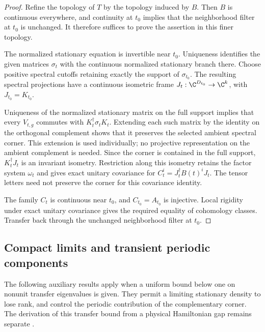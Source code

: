 \begin{proof}\leanok
    Refine the topology of $T$ by the topology induced by $B$.
    Then $B$ is continuous everywhere, and continuity at $t_0$ implies
    that the neighborhood filter at $t_0$ is unchanged. It therefore
    suffices to prove the assertion in this finer topology.

    The normalized stationary equation is invertible near $t_0$.
    Uniqueness identifies the given matrices $\sigma_t$ with the
    continuous normalized stationary branch there. Choose positive
    spectral cutoffs retaining exactly the support of $\sigma_{t_0}$.
    The resulting spectral projections have a continuous isometric
    frame $J_t:\C^{D_{t_0}}\to\C^k$, with $J_{t_0}=K_{t_0}$.

    Uniqueness of the normalized stationary matrix on the full support
    implies that every $V_{t,g}$ commutes with
    $K_t^\dagger\sigma_tK_t$. Extending each such matrix by the identity
    on the orthogonal complement shows that it preserves the selected
    ambient spectral corner. This extension is used individually;
    no projective representation on the ambient complement is needed.
    Since the corner is contained in the full support, $K_t^\dagger J_t$
    is an invariant isometry. Restriction along this isometry retains
    the factor system $\omega_t$ and gives exact unitary covariance for
    $C_t^i=J_t^\dagger B(t)^iJ_t$. The tensor letters need not preserve
    the corner for this covariance identity.

    The family $C_t$ is continuous near $t_0$, and
    $C_{t_0}=A_{t_0}$ is injective. Local rigidity under exact unitary
    covariance gives the required equality of cohomology classes.
    Transfer back through the unchanged neighborhood filter at $t_0$.
\end{proof}

\subsection{Compact limits and transient periodic components}

The following auxiliary results apply when a uniform bound below one on
nonunit transfer eigenvalues is given. They permit a limiting stationary
density to lose rank, and control the periodic contribution of the
complementary corner. The derivation of this transfer bound from a physical
Hamiltonian gap remains separate
\cite{gap:spc11_spt_interpolation_upper_range}.

